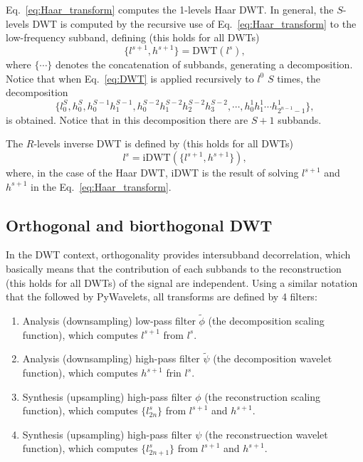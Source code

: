 Eq.~\ref{eq:Haar_transform} computes the 1-levels Haar DWT. In
general, the $S$-levels DWT is computed by the recursive use of
Eq.~\ref{eq:Haar_transform} to the low-frequency subband, defining
(this holds for all DWTs)
\begin{equation}
  \{l^{s+1}, h^{s+1}\} = \text{DWT}(l^s),
  \label{eq:DWT}
\end{equation}
where $\{\cdots\}$ denotes the concatenation of subbands, generating a
decomposition.  Notice that when Eq.~\ref{eq:DWT} is applied
recursively to $l^0$ $S$ times, the decomposition
  \begin{equation}
    \{ l^S_0, h^S_0, h^{S-1}_0 h^{S-1}_1, h^{S-2}_0 h^{S-2}_1 h^{S-2}_2 h^{S-2}_3, \cdots, h^1_0 h^1_1 \cdots h^1_{2^{n-1}-1}\},
  \end{equation}
  is obtained. Notice that in this decomposition there are $S+1$
  subbands.

The $R$-levels inverse DWT is defined by (this holds for all DWTs)
\begin{equation}
  l^s = \text{iDWT}(\{l^{s+1}, h^{s+1}\}),
\end{equation}
where, in the case of the Haar DWT, iDWT is the result of solving
$l^{s+1}$ and $h^{s+1}$ in the Eq.~\ref{eq:Haar_transform}.

\subsection{Orthogonal and biorthogonal DWT}
In the DWT context, orthogonality provides intersubband decorrelation,
which basically means that the contribution of each subbands to the
reconstruction (this holds for all DWTs) of the signal are
independent. Using a similar notation that the followed by PyWavelets,
all transforms are defined by 4 filters:
\begin{enumerate}
\item Analysis (downsampling) low-pass filter $\tilde\phi$ (the decomposition
  scaling function), which computes $l^{s+1}$ from $l^s$.
\item Analysis (downsampling) high-pass filter $\tilde\psi$ (the decomposition
  wavelet function), which computes $h^{s+1}$ frin $l^s$.
\item Synthesis (upsampling) high-pass filter $\phi$ (the
  reconstruction scaling function), which computes $\{l^s_{2n}\}$ from
  $l^{s+1}$ and $h^{s+1}$.
\item Synthesis (upsampling) high-pass filter $\psi$ (the
  reconstruection wavelet function), which computes $\{l^s_{2n+1}\}$
  from $l^{s+1}$ and $h^{s+1}$.
\end{enumerate}

